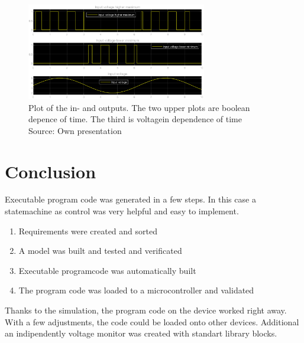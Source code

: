			\begin{figure}[H]
				\centering
				\includegraphics[width=0.7\textwidth]{figures/v_monitor_graph.eps}
				\caption[Plot of the in- and outputs]{Plot of the in- and outputs. The two upper plots are boolean depence of time. The third is voltagein dependence of time\\ Source: Own presentation}
				\label{fig:v_graph}
			\end{figure}
		
\section{Conclusion}
Executable program code was generated in a few steps. In this case a statemachine as control was very helpful and easy to implement.
	\begin{enumerate}
		\item Requirements were created and sorted
		\item A model was built and tested and verificated
		\item Executable programcode was automatically built
		\item The program code was loaded to a microcontroller and validated
	\end{enumerate}
Thanks to the simulation, the program code on the device worked right away. With a few adjustments, the code could be loaded onto other devices.
Additional an indipendently voltage monitor was created with standart library blocks.

